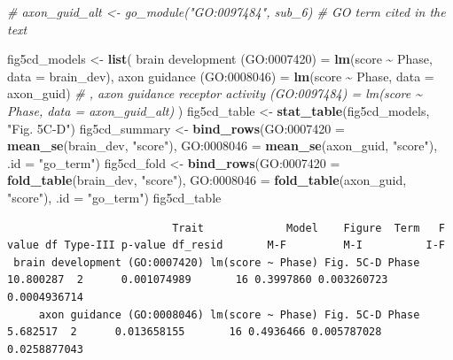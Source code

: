 \documentclass[
  landscape]{article}
\newenvironment{Shaded}{\begin{snugshade}}{\end{snugshade}}
\newcommand{\AttributeTok}[1]{\textcolor[rgb]{0.13,0.29,0.53}{#1}}
\newcommand{\CommentTok}[1]{\textcolor[rgb]{0.56,0.35,0.01}{\textit{#1}}}
\newcommand{\FunctionTok}[1]{\textcolor[rgb]{0.13,0.29,0.53}{\textbf{#1}}}
\newcommand{\NormalTok}[1]{#1}
\newcommand{\OtherTok}[1]{\textcolor[rgb]{0.56,0.35,0.01}{#1}}
\newcommand{\SpecialCharTok}[1]{\textcolor[rgb]{0.81,0.36,0.00}{\textbf{#1}}}
\newcommand{\StringTok}[1]{\textcolor[rgb]{0.31,0.60,0.02}{#1}}
\begin{document}
\begin{Shaded}
\begin{Highlighting}[]
\CommentTok{\# axon\_guid\_alt \textless{}{-} go\_module("GO:0097484", sub\_6)  \# GO term cited in the text}

\NormalTok{fig5cd\_models }\OtherTok{\textless{}{-}} \FunctionTok{list}\NormalTok{(}
  \StringTok{\textasciigrave{}}\AttributeTok{brain development (GO:0007420)}\StringTok{\textasciigrave{}} \OtherTok{=} \FunctionTok{lm}\NormalTok{(score }\SpecialCharTok{\textasciitilde{}}\NormalTok{ Phase, }\AttributeTok{data =}\NormalTok{ brain\_dev),}
  \StringTok{\textasciigrave{}}\AttributeTok{axon guidance (GO:0008046)}\StringTok{\textasciigrave{}}     \OtherTok{=} \FunctionTok{lm}\NormalTok{(score }\SpecialCharTok{\textasciitilde{}}\NormalTok{ Phase, }\AttributeTok{data =}\NormalTok{ axon\_guid)}
  \CommentTok{\# , \textasciigrave{}axon guidance receptor activity (GO:0097484)\textasciigrave{} = lm(score \textasciitilde{} Phase, data = axon\_guid\_alt)}
\NormalTok{)}
\NormalTok{fig5cd\_table }\OtherTok{\textless{}{-}} \FunctionTok{stat\_table}\NormalTok{(fig5cd\_models, }\StringTok{"Fig. 5C{-}D"}\NormalTok{)}
\NormalTok{fig5cd\_summary }\OtherTok{\textless{}{-}} \FunctionTok{bind\_rows}\NormalTok{(}\StringTok{\textasciigrave{}}\AttributeTok{GO:0007420}\StringTok{\textasciigrave{}} \OtherTok{=} \FunctionTok{mean\_se}\NormalTok{(brain\_dev, }\StringTok{"score"}\NormalTok{),}
                            \StringTok{\textasciigrave{}}\AttributeTok{GO:0008046}\StringTok{\textasciigrave{}} \OtherTok{=} \FunctionTok{mean\_se}\NormalTok{(axon\_guid, }\StringTok{"score"}\NormalTok{), }\AttributeTok{.id =} \StringTok{"go\_term"}\NormalTok{)}
\NormalTok{fig5cd\_fold }\OtherTok{\textless{}{-}} \FunctionTok{bind\_rows}\NormalTok{(}\StringTok{\textasciigrave{}}\AttributeTok{GO:0007420}\StringTok{\textasciigrave{}} \OtherTok{=} \FunctionTok{fold\_table}\NormalTok{(brain\_dev, }\StringTok{"score"}\NormalTok{),}
                         \StringTok{\textasciigrave{}}\AttributeTok{GO:0008046}\StringTok{\textasciigrave{}} \OtherTok{=} \FunctionTok{fold\_table}\NormalTok{(axon\_guid, }\StringTok{"score"}\NormalTok{), }\AttributeTok{.id =} \StringTok{"go\_term"}\NormalTok{)}
\NormalTok{fig5cd\_table}
\end{Highlighting}
\end{Shaded}

\begin{verbatim}
                          Trait             Model    Figure  Term   F value df Type-III p-value df_resid       M-F         M-I          I-F
 brain development (GO:0007420) lm(score ~ Phase) Fig. 5C-D Phase 10.800287  2      0.001074989       16 0.3997860 0.003260723 0.0004936714
     axon guidance (GO:0008046) lm(score ~ Phase) Fig. 5C-D Phase  5.682517  2      0.013658155       16 0.4936466 0.005787028 0.0258877043
\end{verbatim}
\end{document}
